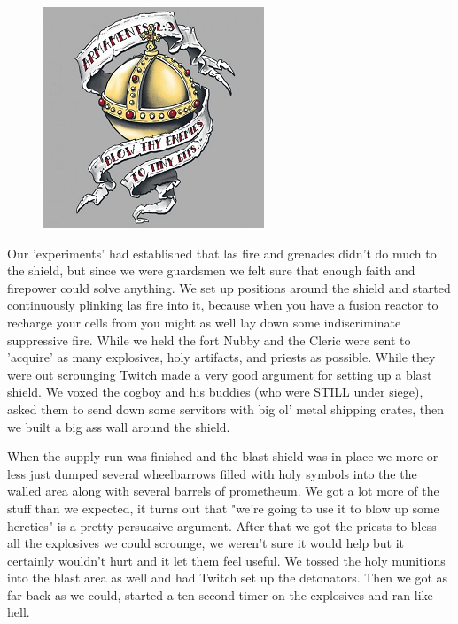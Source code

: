\begin{figure}
	\begin{center}
		\includegraphics[width=\figwidth]{pics/2/16.png}
	\end{center}
\end{figure}
Our 'experiments' had established that las fire and grenades didn't do much to the shield, but since we were guardsmen we felt sure that enough faith and firepower could solve anything. 
We set up positions around the shield and started continuously plinking las fire into it, because when you have a fusion reactor to recharge your cells from you might as well lay down some indiscriminate suppressive fire. 
While we held the fort Nubby and the Cleric were sent to 'acquire' as many explosives, holy artifacts, and priests as possible. 
While they were out scrounging Twitch made a very good argument for setting up a blast shield. 
We voxed the cogboy and his buddies (who were STILL under siege), asked them to send down some servitors with big ol' metal shipping crates, then we built a big ass wall around the shield.

When the supply run was finished and the blast shield was in place we more or less just dumped several wheelbarrows filled with holy symbols into the the walled area along with several barrels of prometheum. 
We got a lot more of the stuff than we expected, it turns out that "we're going to use it to blow up some heretics" is a pretty persuasive argument. 
After that we got the priests to bless all the explosives we could scrounge, we weren't sure it would help but it certainly wouldn't hurt and it let them feel useful. 
We tossed the holy munitions into the blast area as well and had Twitch set up the detonators. 
Then we got as far back as we could, started a ten second timer on the explosives and ran like hell.

